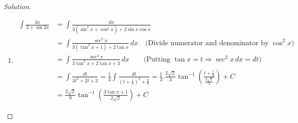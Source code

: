 \documentclass{book}
\theoremstyle{definition}
\newenvironment{solution}
    {\begin{proof}[Solution]}
    {\end{proof}}
\begin{document}
\begin{solution}
\begin{enumerate}[label=(\roman*)]
In the first integral let us put $x^2+4x-12=t\Rightarrow (2x+4)dx=dt$ 
\newline
and in the 2nd integral let $x+2=z\Rightarrow dx=dz$. Thus, the given integral becomes,
\begin{align*}
\frac{1}{2}\int\frac{dt}{\sqrt{t}}-\int\frac{dz}{\sqrt{z^2-4^2}} &= \sqrt{t}-\ln |z+\sqrt{z^2-4^2}|+C \\
&= \sqrt{x^2+4x-12}-\ln |(x+2)+\sqrt{(x+2)^2-16}|+C \\
&= \sqrt{x^2+4x-12}-ln|(x+2)+\sqrt{x^2+4x-12}|+C
\end{align*}

\item 
\begin{align*}
    \int\frac{dx}{3+\sin 2x} &= \int\frac{dx}{3(\sin^2 x+\cos^2 x)+2\sin x\cos x} \\
        &= \int\frac{\sec^2 x}{3(\tan^2 x+1)+2\tan x}\,dx \quad \text{(Divide numerator and denominator by $\cos^2 x$)} \\
        &= \int\frac{\sec^2 x}{3\tan^2 x+2\tan x+3}\,dx \qquad \text{(Putting $\tan x = t \Rightarrow \sec^2 x\,dx = dt$)} \\
        &= \int\frac{dt}{3t^2+2t+3} = \frac{1}{3}\int \frac{dt}{(t+\frac{1}{3})^2+\frac{8}{9}}
        = \frac{1}{3}.\frac{2\sqrt{2}}{3} \tan^{-1}\left(\frac{t+\frac{1}{3}}{\frac{2\sqrt{2}}{3}}\right)+C \\ 
        &= \frac{2\sqrt{2}}{9}\tan^{-1}\left(\frac{3\tan x+1}{2\sqrt{2}}\right)+C
\end{align*}

\end{enumerate}
\end{solution}

\pagebreak
\end{document}
